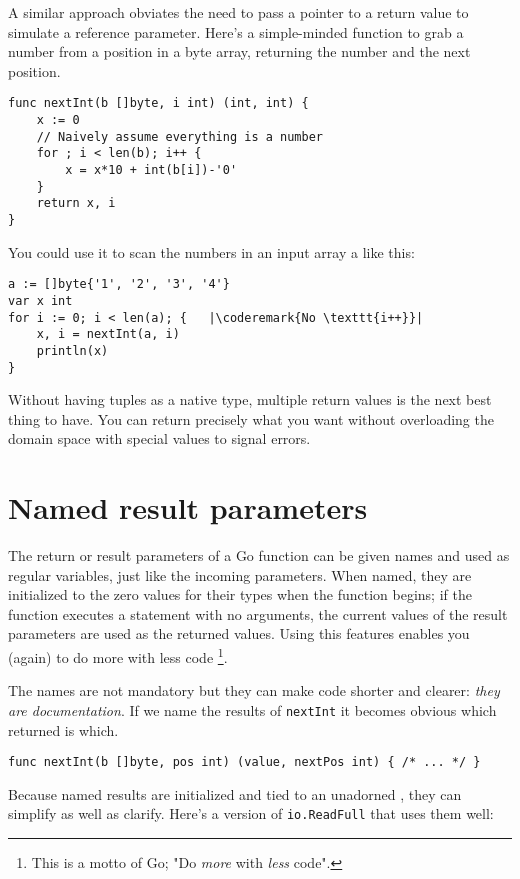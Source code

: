 A similar approach obviates the need to pass a pointer to a return value to
simulate a reference parameter. Here's a simple-minded function to grab a
number from a position in a byte array, returning the number and the next
position.
\begin{lstlisting}
func nextInt(b []byte, i int) (int, int) {
    x := 0
    // Naively assume everything is a number
    for ; i < len(b); i++ {
        x = x*10 + int(b[i])-'0'
    }
    return x, i
}
\end{lstlisting}
You could use it to scan the numbers in an input array a like this:
\begin{lstlisting}
a := []byte{'1', '2', '3', '4'}
var x int
for i := 0; i < len(a); {	|\coderemark{No \texttt{i++}}|
    x, i = nextInt(a, i)
    println(x)
}
\end{lstlisting}
Without having tuples as a native type, multiple return values is the next
best thing to have. You can return precisely what you want without
overloading the domain space with special values to signal errors.

\section{Named result parameters}
\label{sec:named result parameters}
The return or result parameters of a Go function can be given names and used
as regular variables, just like the incoming parameters. When named, they are
initialized to the zero values for their types when the function begins; if the
function executes a  statement with no arguments, the current values of
the result parameters are used as the returned values. Using this
features enables you (again) to do more with less code \footnote{This is
a motto of Go; "Do \emph{more} with \emph{less} code".}.

The names are not mandatory but they can make code shorter and clearer:
\emph{they are documentation}. 
If we name the results of \lstinline{nextInt} it becomes obvious which
returned  is which.

\begin{lstlisting}
func nextInt(b []byte, pos int) (value, nextPos int) { /* ... */ }
\end{lstlisting}
Because named results are initialized and tied to an unadorned
,
they can simplify as well as clarify. Here's a version of
\lstinline{io.ReadFull} that uses them well:

